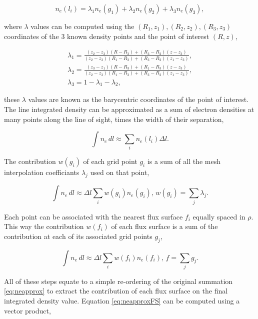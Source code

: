 \begin{equation}
  n_e(l_i) = \lambda_1 n_e(g_1) + \lambda_2 n_e(g_2) + \lambda_3 n_e(g_3),
\end{equation}

\noindent where $\lambda$ values can be computed using the $(R_1,z_1), (R_2,z_2), (R_3,z_3)$ coordinates of the 3 known density points and the point of interest $(R, z)$,

\begin{gather}
\lambda_1 = \frac{(z_2 - z_3)(R - R_3) + (R_3 - R_2)(z - z_3)}{(z_2 - z_3)(R_1 - R_3) + (R_3 - R_2)(z_1 - z_3)},\\
\lambda_2 = \frac{(z_3 - z_1)(R - R_3) + (R_1 - R_3)(z - z_3)}{(z_2 - z_3)(R_1 - R_3) + (R_3 - R_2)(z_1 - z_3)},\\
\lambda_3 = 1-\lambda_1-\lambda_2,
\end{gather}

\noindent these $\lambda$ values are known as the barycentric coordinates of the point of interest. The line integrated density can be approximated as a sum of electron densities at many points along the line of sight, times the width of their separation,

\begin{equation}
  \int n_e \, dl \approx \sum_i n_e(l_i) \Delta l.
  \label{eq:neapprox}
\end{equation}

\noindent The contribution $w(g_i)$ of each grid point $g_i$ is a sum of all the mesh interpolation coefficiants $\lambda_j$ used on that point,

\begin{equation}
  \int n_e \, dl \approx \Delta l \sum_i w(g_i) n_e(g_i), \, w(g_i) = \sum_j \lambda_j.
\end{equation}

\noindent Each point can be associated with the nearest flux surface $f_i$ equally spaced in $\rho$. This way the contribution $w(f_i)$ of each flux surface is a sum of the contribution at each of its associated grid points $g_j$,

\begin{equation}
  \int n_e \, dl \approx \Delta l \sum_i w(f_i) n_e(f_i), \, f = \sum_j g_j.
  \label{eq:neapproxFS}
\end{equation}

\noindent All of these steps equate to a simple re-ordering of the original summation \ref{eq:neapprox} to extract the contribution of each flux surface on the final integrated density value. Equation \ref{eq:neapproxFS} can be computed using a vector product,

